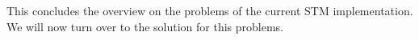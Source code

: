 

This concludes the overview on the problems of the current STM implementation. We will now turn over to the 
solution for this problems.







% 
% 

